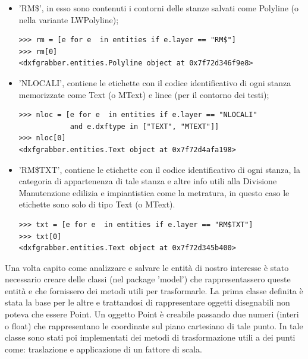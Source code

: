 \documentclass[12pt]{report}
\begin{document}
\begin{itemize}
\item 'RM\$', in esso sono contenuti i contorni delle stanze salvati come Polyline (o nella variante LWPolyline);
\begin{lstlisting}[label=codice,caption=Analisi del layer 'RM\$', frame=single]
>>> rm = [e for e  in entities if e.layer == "RM$"]
>>> rm[0]
<dxfgrabber.entities.Polyline object at 0x7f72d346f9e8>
\end{lstlisting}

\vspace{5mm} %

\item 'NLOCALI', contiene le etichette con il codice identificativo di ogni stanza memorizzate come Text (o MText) e linee (per il contorno dei testi);
\begin{lstlisting}[label=codice,caption=Analisi del layer 'NLOCALI', frame=single]
>>> nloc = [e for e  in entities if e.layer == "NLOCALI" 
            and e.dxftype in ["TEXT", "MTEXT"]]
>>> nloc[0]
<dxfgrabber.entities.Text object at 0x7f72d4afa198>
\end{lstlisting}

\vspace{5mm} %

\item 'RM\$TXT', contiene le etichette con il codice identificativo di ogni stanza, la categoria di appartenenza di tale stanza e altre info utili alla Divisione Manutenzione edilizia e impiantistica come la metratura, in questo caso le etichette sono solo di tipo Text (o MText).
\begin{lstlisting}[label=codice,caption=Analisi del layer 'RM\$TXT', frame=single]
>>> txt = [e for e  in entities if e.layer == "RM$TXT"]
>>> txt[0]
<dxfgrabber.entities.Text object at 0x7f72d345b400>
\end{lstlisting}

\vspace{5mm} %

\end{itemize}

Una volta capito come analizzare e salvare le entità di nostro interesse è stato necessario creare delle classi (nel package 'model') che rappresentassero queste entità e che fornissero dei metodi utili per trasformarle. 
La prima classe definita è stata la base per le altre e trattandosi di rappresentare oggetti disegnabili non poteva che essere Point. 
Un oggetto Point è creabile passando due numeri (interi o float) che rappresentano le coordinate sul piano cartesiano di tale punto. 
In tale classe sono stati poi implementati dei metodi di trasformazione utili a dei punti come: traslazione e applicazione di un fattore di scala.
\end{document}
